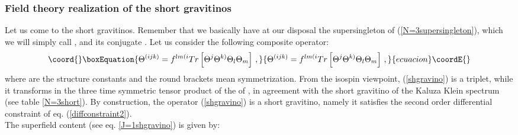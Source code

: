 \documentclass[a4paper,12pt]{article}
\def\n010{N^{0,1,0}}
\providecommand{\eqn}[1]{(\ref{#1})}
\begin{document}
\subsubsection{Field theory realization of the short gravitinos}
Let us come to the short gravitinos.
Remember that we basically have at our disposal the \coordHE{}
supersingleton of (\ref{N=3supersingleton}), which we will simply
call \coordHE{}, and its conjugate \coordHE{}.
Let us consider the following composite operator:
\begin{equation}\coord{}\boxEquation{
\Theta^{(ijk)}=f^{lm(i}Tr\left[\Theta^j\Theta^{k)}
\Theta_l\Theta_m\right]\,,\label{shgravino}
}{
\Theta^{(ijk)}=f^{lm(i}Tr\left[\Theta^j\Theta^{k)}
\Theta_l\Theta_m\right]\,,}{ecuacion}\coordE{}\end{equation}
where \coordHE{} are the \coordHE{} structure constants and the round
brackets mean symmetrization.
From the isospin viewpoint, \eqn{shgravino} is a triplet, while
it transforms in the three time symmetric tensor
product of the \coordHE{} of \coordHE{}, in agreement with the
\coordHE{} short gravitino of the \myHighlight{$\n010$}\coordHE{}
Kaluza Klein spectrum (see table \ref{N=3short}).
By construction, the operator (\ref{shgravino}) is a short gravitino,
namely it satisfies the second order differential constraint
of eq. (\ref{diffconstraint2}).
\\
The \coordHE{} superfield content (see eq. \ref{J=1shgravino})
is given by:
\end{document}
